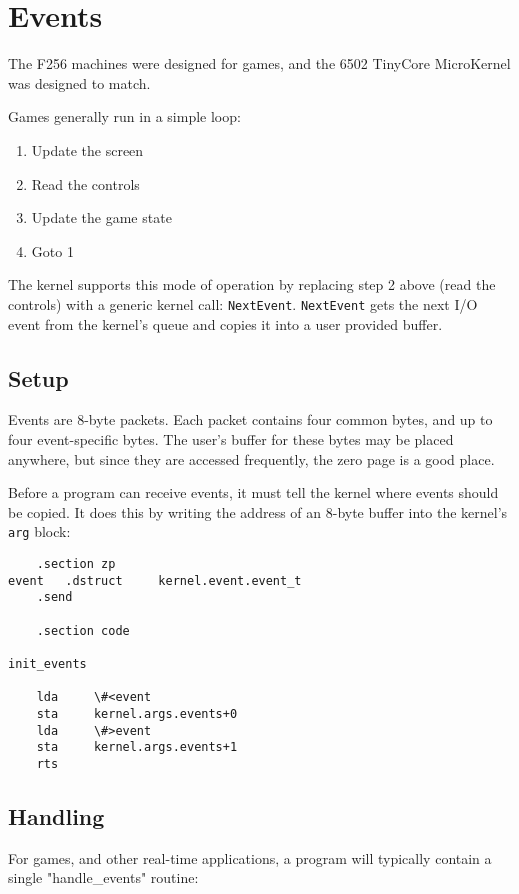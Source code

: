 \section*{Events}
The F256 machines were designed for games, and the 6502 TinyCore MicroKernel was designed to match.

Games generally run in a simple loop:

\begin{enumerate}
    \item Update the screen
    \item Read the controls
    \item Update the game state
    \item Goto 1
\end{enumerate}

The kernel supports this mode of operation by replacing step 2 above (read the controls) with a generic kernel call: \verb+NextEvent+.  \verb+NextEvent+ gets the next I/O event from the kernel's queue and copies it into a user provided buffer.  

\subsection*{Setup}
Events are 8-byte packets.  Each packet contains four common bytes, and up to four event-specific bytes.  The user's buffer for these bytes may be placed anywhere, but since they are accessed frequently, the zero page is a good place.

Before a program can receive events, it must tell the kernel where events should be copied.  It does this by writing the address of an 8-byte buffer into the kernel's \verb+arg+ block:

\begin{verbatim}
    .section zp
event   .dstruct	 kernel.event.event_t
    .send

    .section code

init_events

    lda     \#<event
    sta     kernel.args.events+0
    lda     \#>event
    sta     kernel.args.events+1
    rts
\end{verbatim}

\subsection*{Handling}
For games, and other real-time applications, a program will typically contain a single "handle\_events" routine:

